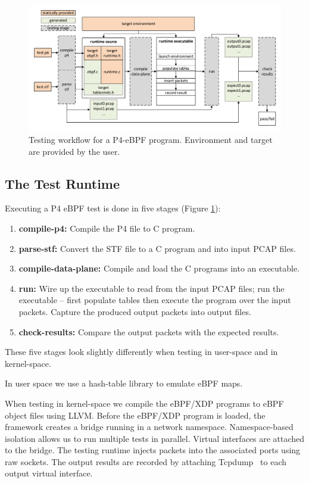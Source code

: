 \begin{figure}
	\centering
	\includegraphics[width=\linewidth]{testing_workflow}
	\caption{Testing workflow for a P4-eBPF program. Environment and
		target are provided by the user.}
	\label{fig:p4_testflow}
\end{figure}

\subsection{The Test Runtime}

Executing a P4 eBPF test is done in five stages (Figure
\ref{fig:p4_testflow}):

\begin{enumerate}
\item\textbf{compile-p4:} Compile the P4 file to C program.
\item \textbf{parse-stf:} Convert the STF file to a C program and into
  input PCAP files.
\item \textbf{compile-data-plane:} Compile and load the C programs
  into an executable.
\item \textbf{run:} Wire up the executable to read from the input PCAP
  files; run the executable -- first populate tables then execute the
  program over the input packets.  Capture the produced output packets
  into output files.
\item \textbf{check-results:} Compare the output packets with the
  expected results.
\end{enumerate}

\noindent These five stages look slightly differently when testing in
user-space and in kernel-space.

In user space we use a hash-table library to emulate eBPF maps.

When testing in kernel-space we compile the eBPF/XDP programs to eBPF
object files using LLVM.  Before the eBPF/XDP program is loaded, the
framework creates a bridge running in a network namespace.
Namespace-based isolation allows us to run multiple tests in parallel.
Virtual interfaces are attached to the bridge.  The testing runtime
injects packets into the associated ports using raw sockets. The
output results are recorded by attaching Tcpdump~\cite{tcpdump} to
each output virtual interface.
